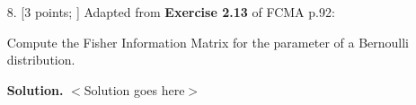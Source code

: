 \documentclass[10pt]{article}
\begin{document}
\begin{itemize}
\item[8.] [3 points; \boldred{Required only for Graduates}]
Adapted from {\bf Exercise 2.13} of FCMA p.92:

Compute the Fisher Information Matrix for the parameter of a Bernoulli distribution.

{\bf Solution.} $<$Solution goes here$>$


\end{itemize}
\end{document}
